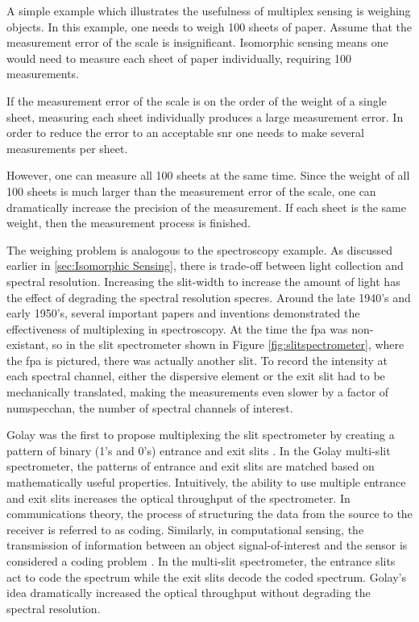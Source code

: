 A simple example which illustrates the usefulness of multiplex sensing is weighing objects. In this example, one needs to weigh 100 sheets of paper. Assume that the measurement error of the scale is insignificant. Isomorphic sensing means one would need to measure each sheet of paper individually, requiring 100 measurements. 

If the measurement error of the scale is on the order of the weight of a single sheet, measuring each sheet individually produces a large measurement error. In order to reduce the error to an acceptable \gls{snr} one needs to make several measurements per sheet.

However, one can measure all 100 sheets at the same time. Since the weight of all 100 sheets is much larger than the measurement error of the scale, one can dramatically increase the precision of the measurement. If each sheet is the same weight, then the measurement process is finished.

The weighing problem is analogous to the spectroscopy example. As discussed earlier in \autoref{sec:Isomorphic Sensing}, there is trade-off between light collection and spectral resolution. Increasing the slit-width to increase the amount of light has the effect of degrading the spectral resolution \gls{specres}. Around the late 1940's and early 1950's, several important papers and inventions demonstrated the effectiveness of multiplexing in spectroscopy. At the time the \gls{fpa} was non-existant, so in the slit spectrometer shown in Figure \ref{fig:slitspectrometer}, where the \gls{fpa} is pictured, there was actually another slit. To record the intensity at each spectral channel, either the dispersive element or the exit slit had to be mechanically translated, making the measurements even slower by a factor of \gls{numspecchan}, the number of spectral channels of interest. 

Golay was the first to propose multiplexing the slit spectrometer by creating a pattern of binary (1's and 0's) entrance and exit slits \cite{golay1949multi}. In the Golay multi-slit spectrometer, the patterns of entrance and exit slits are matched based on mathematically useful properties. Intuitively, the ability to use multiple entrance and exit slits increases the optical throughput of the spectrometer. In communications theory, the process of structuring the data from the source to the receiver is referred to as \gls{coding}. Similarly, in computational sensing, the transmission of information between an object signal-of-interest and the sensor is considered a coding problem \cite{brady2009optical}. In the multi-slit spectrometer, the entrance slits act to code the spectrum while the exit slits decode the coded spectrum. Golay's idea dramatically increased the optical throughput without degrading the spectral resolution. 

